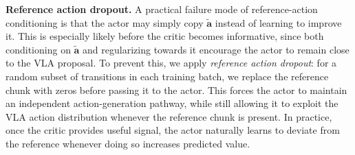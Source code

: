 \textbf{Reference action dropout.} A practical failure mode of reference-action conditioning is that the actor may simply copy $\tilde{\mathbf{a}}$ instead of learning to improve it. This is especially likely before the critic becomes informative, since both conditioning on $\tilde{\mathbf{a}}$ and regularizing towards it encourage the actor to remain close to the VLA proposal. To prevent this, we apply \emph{reference action dropout}: for a random subset of transitions in each training batch, we replace the reference chunk with zeros before passing it to the actor. This forces the actor to maintain an independent action-generation pathway, while still allowing it to exploit the VLA action distribution whenever the reference chunk is present. In practice, once the critic provides useful signal, the actor naturally learns to deviate from the reference whenever doing so increases predicted value.


